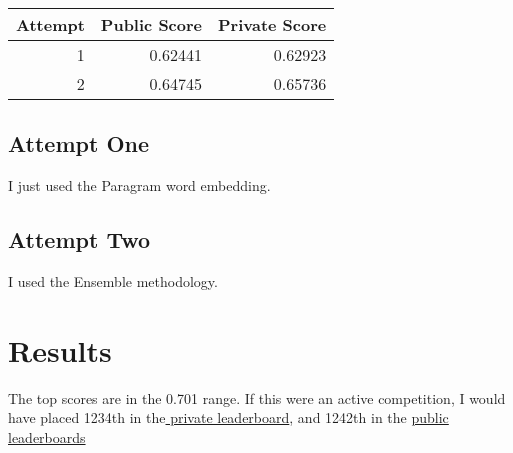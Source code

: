 \documentclass[11pt]{article}
\begin{document}
\begin{center}
\begin{tabular}{rrr}
Attempt & Public Score & Private Score\\
\hline
1 & 0.62441 & 0.62923\\
2 & 0.64745 & 0.65736\\
\end{tabular}
\end{center}



\subsection{Attempt One}
\label{sec:orga41d676}

I just used the Paragram word embedding.

\subsection{Attempt Two}
\label{sec:orgffde2a7}

I used the Ensemble methodology.


\section{Results}
\label{sec:org6b5a73b}

The top scores are in the 0.701 range. If this were an active competition, I would have placed 1234th in the\href{https://www.kaggle.com/c/quora-insincere-questions-classification/leaderboard}{ private leaderboard}, and 1242th in the \href{https://www.kaggle.com/c/quora-insincere-questions-classification/leaderboard}{public leaderboards}  
\end{document}
